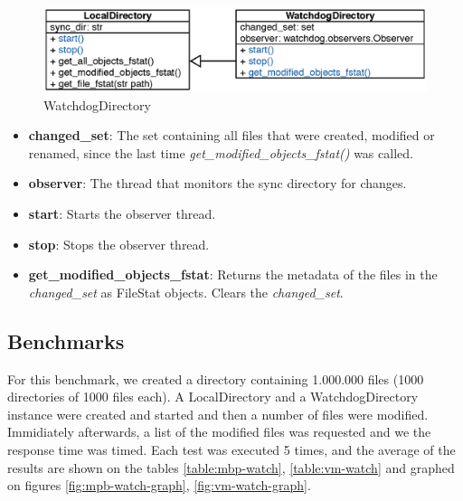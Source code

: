   \begin{figure}[H]
    \centering
    \includegraphics{Images/WatchDir.eps}
    \caption{WatchdogDirectory}
    \label{fig:watchdir_uml}
  \end{figure}

  \begin{itemize}
    \item \textbf{changed\_set}: The set containing all files that were created, modified or renamed, since the last time \emph{get\_modified\_objects\_fstat()} was called.
    \item \textbf{observer}: The thread that monitors the sync directory for changes.\\

    \item \textbf{start}: Starts the observer thread.
    \item \textbf{stop}: Stops the observer thread.
    \item \textbf{get\_modified\_objects\_fstat}: Returns the metadata of the files in the \emph{changed\_set} as FileStat objects. Clears the \emph{changed\_set}.
  \end{itemize}

  \subsection{Benchmarks}
    For this benchmark, we created a directory containing 1.000.000 files (1000 directories of 1000 files each). A LocalDirectory and a WatchdogDirectory instance were created and started and then a number of files were modified. Immidiately afterwards, a list of the modified files was requested and we the response time was timed. Each test was executed 5 times, and the average of the results are shown on the tables \ref{table:mbp-watch}, \ref{table:vm-watch} and graphed on figures \ref{fig:mpb-watch-graph}, \ref{fig:vm-watch-graph}.

